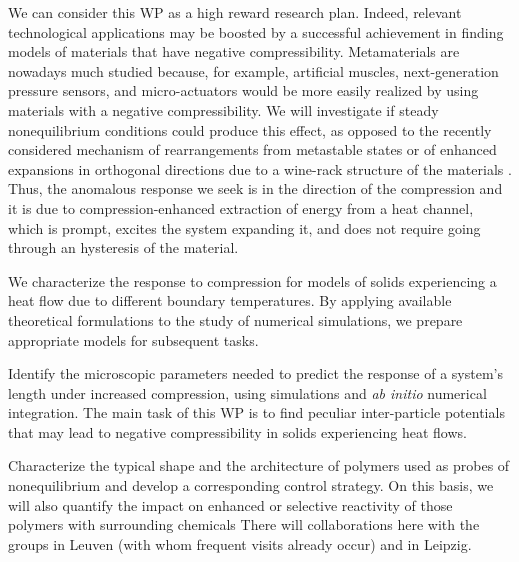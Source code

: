 \begin{workpackage}
\begin{wpdescription}
We can consider this WP as a high reward research plan. Indeed, relevant technological applications
may be boosted by a successful achievement in finding models of materials that have negative compressibility.
Metamaterials are nowadays much studied \cite{NM12,CG15} because, for example, artificial muscles,
next-generation pressure sensors, and micro-actuators would be
more easily realized by using materials with a negative compressibility. We will investigate
if steady nonequilibrium conditions could produce this effect, as opposed to the recently considered 
mechanism of rearrangements from metastable states \cite{NM12} or of enhanced expansions in orthogonal directions
due to a wine-rack structure of the materials \cite{CG15}. Thus, the anomalous response we seek is in the direction
of the compression and it is due to compression-enhanced extraction of energy from a heat channel,
which is prompt, excites the system expanding it, 
and does not require going through an hysteresis of the material. 

\printbibliography[heading=proposal-bib,env=proposal-env]

\end{wpdescription}

\begin{tasklist}

  \begin{task}[title=TASK1,id=task1,PM=3,lead=UNIPD,wphases={0-12!1,12-24!0.5}]
  We characterize the response to compression
  for models of solids experiencing a heat flow due to different boundary temperatures.
  By applying available theoretical formulations to the study of numerical simulations,
  we prepare appropriate models for subsequent tasks.
  \end{task}

  \begin{task}[title=TASK2,id=task2,PM=3,lead=UNIPD,partners=KUL,wphases={12-24!0.5,24-36!1}]
  Identify the microscopic parameters needed to predict the response
  of a system's length under increased compression, using simulations
  and {\it ab initio} numerical integration.
  The main task of this WP is to find peculiar inter-particle
  potentials that may lead to negative compressibility in solids
  experiencing heat flows.
  \end{task}

  \begin{task}[title=TASK3,id=task3,PM=6,lead=UNIPD,wphases={18-24!0.5,24-48!1},partners={KUL,ULEI}]
  Characterize the typical shape and the architecture of polymers used
  as probes of nonequilibrium and develop a corresponding control
  strategy.
%
  On this basis, we will also quantify the impact on enhanced or
  selective reactivity of those polymers with surrounding chemicals
  There will collaborations here with the groups in Leuven (with whom
  frequent visits already occur) and in Leipzig.
  \end{task}


\end{tasklist}
\end{workpackage}
